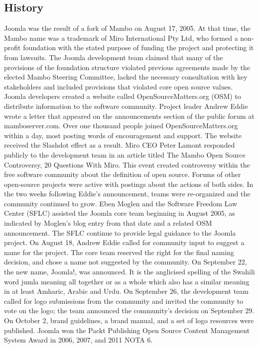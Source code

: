 \subsection{History}
\label{joomla_his}
Joomla was the result of a fork of Mambo on August 17, 2005. At that time, the Mambo name was a trademark of Miro International Pty Ltd, who formed a non-profit foundation with the stated purpose of funding the project and protecting it from lawsuits. The Joomla development team claimed that many of the provisions of the foundation structure violated previous agreements made by the elected Mambo Steering Committee, lacked the necessary consultation with key stakeholders and included provisions that violated core open source values.
Joomla developers created a website called OpenSourceMatters.org (OSM) to distribute information to the software community. Project leader Andrew Eddie wrote a letter that appeared on the announcements section of the public forum at mamboserver.com. Over one thousand people joined OpenSourceMatters.org within a day, most posting words of encouragement and support. The website received the Slashdot effect as a result. Miro CEO Peter Lamont responded publicly to the development team in an article titled The Mambo Open Source Controversy, 20 Questions With Miro. This event created controversy within the free software community about the definition of open source. Forums of other open-source projects were active with postings about the actions of both sides.
In the two weeks following Eddie's announcement, teams were re-organized and the community continued to grow. Eben Moglen and the Software Freedom Law Center (SFLC) assisted the Joomla core team beginning in August 2005, as indicated by Moglen's blog entry from that date and a related OSM announcement. The SFLC continue to provide legal guidance to the Joomla project.
On August 18, Andrew Eddie called for community input to suggest a name for the project. The core team reserved the right for the final naming decision, and chose a name not suggested by the community. On September 22, the new name, Joomla!, was announced. It is the anglicised spelling of the Swahili word jumla meaning all together or as a whole which also has a similar meaning in at least Amharic, Arabic and Urdu. On September 26, the development team called for logo submissions from the community and invited the community to vote on the logo; the team announced the community's decision on September 29. On October 2, brand guidelines, a brand manual, and a set of logo resources were published.
Joomla won the Packt Publishing Open Source Content Management System Award in 2006, 2007, and 2011 NOTA 6. 


